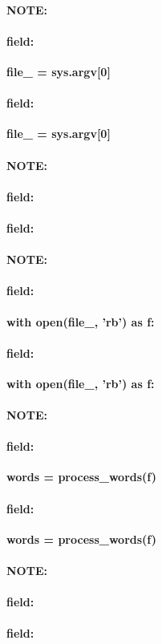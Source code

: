 \documentclass[12pt]{article}
\newenvironment{note}{\paragraph{NOTE:}}{}
\newenvironment{field}{\paragraph{field:}}{}
\begin{document}
\begin{note}
\begin{field}
\textbf{\large file_ = sys.argv[0]}
\end{field}
\begin{field}
\textbf{\large file_ = sys.argv[0]}
\begin{description}

\end{description}
\end{field}
\end{note}
\begin{note}
\begin{field}
\textbf{\large }
\end{field}
\begin{field}
\textbf{\large }
\begin{description}

\end{description}
\end{field}
\end{note}
\begin{note}
\begin{field}
\textbf{\large with open(file_, 'rb') as f:}
\end{field}
\begin{field}
\textbf{\large with open(file_, 'rb') as f:}
\begin{description}

\end{description}
\end{field}
\end{note}
\begin{note}
\begin{field}
\textbf{\large words = process_words(f)}
\end{field}
\begin{field}
\textbf{\large words = process_words(f)}
\begin{description}

\end{description}
\end{field}
\end{note}
\begin{note}
\begin{field}
\textbf{\large }
\end{field}
\begin{field}
\textbf{\large }
\begin{description}

\end{description}
\end{field}
\end{note}
\end{document}
